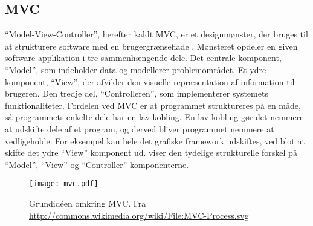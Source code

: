 \subsection{MVC}

\enquote{Model-View-Controller}, herefter kaldt MVC, er et designmønster, der bruges til at strukturere software med en brugergrænseflade \cite{mvcLecture}. Mønsteret opdeler en given software applikation i tre sammenhængende dele. Det centrale komponent, \enquote{Model}, som indeholder data og modellerer problemområdet. Et ydre komponent, \enquote{View}, der afvikler den visuelle repræsentation af information til brugeren. Den tredje del, \enquote{Controlleren}, som implementerer systemets funktionaliteter. Fordelen ved MVC er at programmet struktureres på en måde, så programmets enkelte dele har en lav kobling. En lav kobling gør det nemmere at udskifte dele af et program, og derved bliver programmet nemmere at vedligeholde. For eksempel kan hele det grafiske framework udskiftes, ved blot at skifte det ydre \enquote{View} komponent ud.  viser den tydelige strukturelle forskel på \enquote{Model}, \enquote{View} og \enquote{Controller} komponenterne.

\begin{figure}
  \centering
  \texttt{[image: mvc.pdf]}
  \caption{Grundidéen omkring MVC. Fra \url{http://commons.wikimedia.org/wiki/File:MVC-Process.svg} } \label{fig:mvc}
\end{figure}
